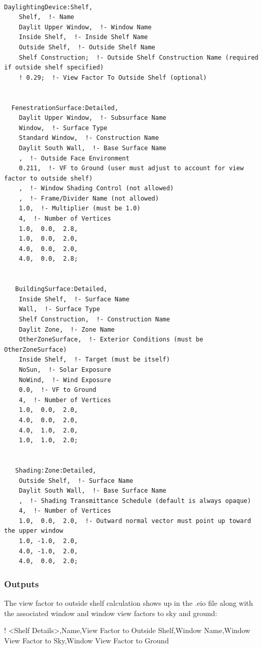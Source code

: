 \begin{lstlisting}

DaylightingDevice:Shelf,
    Shelf,  !- Name
    Daylit Upper Window,  !- Window Name
    Inside Shelf,  !- Inside Shelf Name
    Outside Shelf,  !- Outside Shelf Name
    Shelf Construction;  !- Outside Shelf Construction Name (required if outside shelf specified)
    ! 0.29;  !- View Factor To Outside Shelf (optional)


  FenestrationSurface:Detailed,
    Daylit Upper Window,  !- Subsurface Name
    Window,  !- Surface Type
    Standard Window,  !- Construction Name
    Daylit South Wall,  !- Base Surface Name
    ,  !- Outside Face Environment
    0.211,  !- VF to Ground (user must adjust to account for view factor to outside shelf)
    ,  !- Window Shading Control (not allowed)
    ,  !- Frame/Divider Name (not allowed)
    1.0,  !- Multiplier (must be 1.0)
    4,  !- Number of Vertices
    1.0,  0.0,  2.8,
    1.0,  0.0,  2.0,
    4.0,  0.0,  2.0,
    4.0,  0.0,  2.8;


   BuildingSurface:Detailed,
    Inside Shelf,  !- Surface Name
    Wall,  !- Surface Type
    Shelf Construction,  !- Construction Name
    Daylit Zone,  !- Zone Name
    OtherZoneSurface,  !- Exterior Conditions (must be OtherZoneSurface)
    Inside Shelf,  !- Target (must be itself)
    NoSun,  !- Solar Exposure
    NoWind,  !- Wind Exposure
    0.0,  !- VF to Ground
    4,  !- Number of Vertices
    1.0,  0.0,  2.0,
    4.0,  0.0,  2.0,
    4.0,  1.0,  2.0,
    1.0,  1.0,  2.0;


   Shading:Zone:Detailed,
    Outside Shelf,  !- Surface Name
    Daylit South Wall,  !- Base Surface Name
    ,  !- Shading Transmittance Schedule (default is always opaque)
    4,  !- Number of Vertices
    1.0,  0.0,  2.0,  !- Outward normal vector must point up toward the upper window
    1.0, -1.0,  2.0,
    4.0, -1.0,  2.0,
    4.0,  0.0,  2.0;
\end{lstlisting}

\subsubsection{Outputs}\label{outputs-3-002}

The view factor to outside shelf calculation shows up in the .eio file along with the associated window and window view factors to sky and ground:

! \textless{}Shelf Details\textgreater{},Name,View Factor to Outside Shelf,Window Name,Window View Factor to Sky,Window View Factor to Ground

